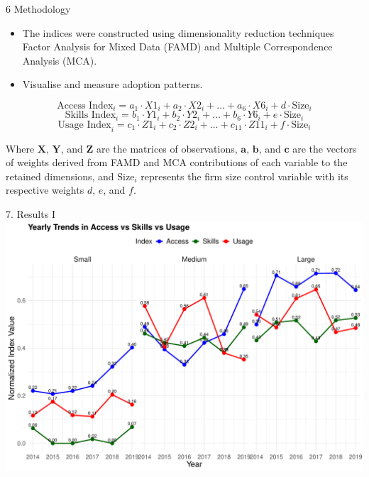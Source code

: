 \documentclass[
  ignorenonframetext,
]{beamer}
\providecommand{\tightlist}{%
  \setlength{\itemsep}{0pt}\setlength{\parskip}{0pt}}
\begin{document}
\begin{frame}{6 Methodology}
\label{methodology}
\begin{itemize}
\tightlist
\item
  The indices were constructed using dimensionality reduction techniques
  Factor Analysis for Mixed Data (FAMD) and Multiple Correspondence
  Analysis (MCA).
\item
  Visualise and measure adoption patterns.
\end{itemize}

\[ \text{Access Index}_i = a_1 \cdot X1_i + a_2 \cdot X2_i + \ldots + a_6 \cdot X6_i + d \cdot \text{Size}_i \]
\[ \text{Skills Index}_i = b_1 \cdot Y1_i + b_2 \cdot Y2_i + \ldots + b_6 \cdot Y6_i + e \cdot \text{Size}_i \]
\[ \text{Usage Index}_i = c_1 \cdot Z1_i + c_2 \cdot Z2_i + \ldots + c_{11} \cdot Z11_i + f \cdot \text{Size}_i \]

Where \(\mathbf{X}\), \(\mathbf{Y}\), and \(\mathbf{Z}\) are the
matrices of observations, \(\mathbf{a}\), \(\mathbf{b}\), and
\(\mathbf{c}\) are the vectors of weights derived from FAMD and MCA
contributions of each variable to the retained dimensions, and
\(\text{Size}_i\) represents the firm size control variable with its
respective weights \(d\), \(e\), and \(f\).
\end{frame}

\begin{frame}{7. Results I}
\label{results-i}
\includegraphics{FactoAnalysisDigitalDivide_files/figure-beamer/yearTrendSize-1.pdf}
\end{frame}
\end{document}
